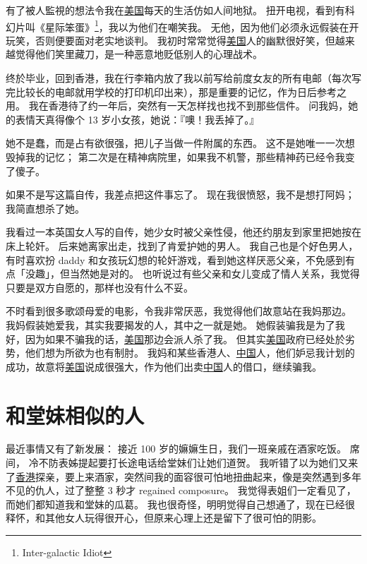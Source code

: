 \documentclass[12pt]{report}
\begin{document}

有了被人監視的想法令我在\uline{美国}每天的生活仿如人间地狱。  扭开电视，看到有科幻片叫《星际笨蛋》\footnote{Inter-galactic Idiot}，我以为他们在嘲笑我。  无他，因为他们必须永远假装在开玩笑，否则便要面对老实地谈判。  我初时常常觉得\uline{美国}人的幽默很好笑，但越来越觉得他们笑里藏刀，是一种恶意地贬低别人的心理战术。

终於毕业，回到香港，我在行李箱内放了我以前写给前度女友的所有电邮（每次写完比较长的电邮就用学校的打印机印出来），那是重要的记忆，作为日后参考之用。 我在香港待了约一年后，突然有一天怎样找也找不到那些信件。 问我妈，她的表情天真得像个 13 岁小女孩，她说：『噢！我丢掉了。』

她不是蠢，而是占有欲很强，把儿子当做一件附属的东西。  这不是她唯一一次想毁掉我的记忆； 第二次是在精神病院里，如果我不机警，那些精神药已经令我变了傻子。

如果不是写这篇自传，我差点把这件事忘了。  现在我很愤怒，我不是想打阿妈； 我简直想杀了她。 

我看过一本英国女人写的自传，她少女时被父亲性侵，他还约朋友到家里把她按在床上轮奸。 后来她离家出走，找到了肯爱护她的男人。 我自己也是个好色男人，有时喜欢扮 daddy 和女孩玩幻想的轮奸游戏，看到她这样厌恶父亲，不免感到有点「没趣」，但当然她是对的。  也听说过有些父亲和女儿变成了情人关系，我觉得只要是双方自愿的，那样也没有什么不妥。

不时看到很多歌颂母爱的电影，令我非常厌恶，我觉得他们故意站在我妈那边。 我妈假装她爱我，其实我要揭发的人，其中之一就是她。  她假装骗我是为了我好，因为如果不骗我的话，\uline{美国}那边会派人杀了我。 但其实\uline{美国}政府已经处於劣势，他们想为所欲为也有制肘。 我妈和某些香港人、\uline{中国}人，他们妒忌我计划的成功，故意将\uline{美国}说成很强大，作为他们出卖\uline{中国}人的借口，继续骗我。

\chapter{和堂妹相似的人}

最近事情又有了新发展：  接近 100 岁的嫲嫲生日，我们一班亲戚在酒家吃饭。  席间， 冷不防表姊提起要打长途电话给堂妹们让她们道贺。  我听错了以为她们又来了\uline{香港}探亲，要上来酒家，突然间我的面容很可怕地扭曲起来，像是突然遇到多年不见的仇人，过了整整 3 秒才 regained composure。 我觉得表姐们一定看见了，而她们都知道我和堂妹的瓜葛。  我也很奇怪，明明觉得自己想通了，现在已经很释怀，和其他女人玩得很开心，但原来心理上还是留下了很可怕的阴影。
\end{document}
